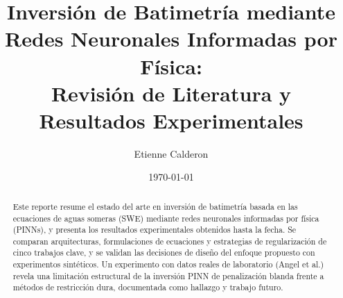 \documentclass[11pt,a4paper]{article}
\title{Inversión de Batimetría mediante Redes Neuronales Informadas por Física:\\
       Revisión de Literatura y Resultados Experimentales}
\author{Etienne Calderon}
\date{\today}
\begin{document}
\maketitle

\begin{abstract}
Este reporte resume el estado del arte en inversión de batimetría
basada en las ecuaciones de aguas someras (SWE) mediante redes neuronales
informadas por física (PINNs), y presenta los resultados experimentales
obtenidos hasta la fecha. Se comparan arquitecturas, formulaciones de ecuaciones
y estrategias de regularización de cinco trabajos clave, y se validan
las decisiones de diseño del enfoque propuesto con experimentos sintéticos.
Un experimento con datos reales de laboratorio (Angel et al.) revela una
limitación estructural de la inversión PINN de penalización blanda frente
a métodos de restricción dura, documentada como hallazgo y trabajo futuro.
\end{abstract}

\tableofcontents
\newpage









\appendix




\end{document}
